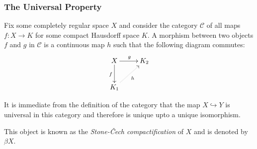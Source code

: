 \subsubsection*{The Universal Property}

Fix some completely regular space $X$ and consider the category $\mathscr C$ of all maps $f: X\to K$ for some compact Hausdorff space $K$. A morphism between two objects $f$ and $g$ in $\mathscr C$ is a continuous map $h$ such that the following diagram commutes: 
\begin{equation*}
\xymatrix {
    X\ar[d]_f\ar[r]^g & K_2\\
    K_1\ar@{.>}[ru]_h
}
\end{equation*}

It is immediate from the definition of the category that the map $X\hookrightarrow Y$ is universal in this category and therefore is unique upto a unique isomorphism. 

This object is known as the \textit{Stone-\v{C}ech compactification} of $X$ and is denoted by $\beta X$.